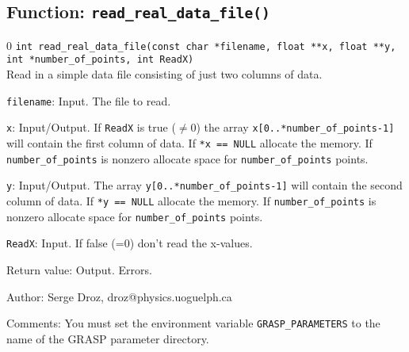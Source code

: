 \subsection{Function: {\tt read\_real\_data\_file()}}
\setcounter{equation}0
{\tt int read\_real\_data\_file(const char *filename, float **x, float **y, 
     int *number\_of\_points, int ReadX)}\\
Read in a simple data file consisting of just two columns of
data.
\begin{description}
\item{{\tt filename}}: Input. The file to read.
\item{{\tt x}}: Input/Output. If {\tt ReadX} is true ($\neq 0$) the array 
                   {\tt x[0..*number\_of\_points-1]} will contain the
				   first column of data. If {\tt **x == NULL} 
				   allocate the memory. If {\tt number\_of\_points}
				   is nonzero allocate space for {\tt number\_of\_points}
				   points. 
\item{{\tt y}}: Input/Output. The array 
                   {\tt y[0..*number\_of\_points-1]} will contain the
				   second column of data. If {\tt **y == NULL} 
				   allocate the memory. If {\tt number\_of\_points}
				   is nonzero allocate space for {\tt number\_of\_points}
				   points. 
\item{{\tt ReadX}}: Input. If false (=0) don't read the x-values.				   
\item{Return value}: Output. Errors.
\end{description}
\begin{description}
\item{Author:} Serge Droz, droz@physics.uoguelph.ca
\item{Comments:} You must set the environment variable 
                 {\tt GRASP\_PARAMETERS} to the name of the 
				 GRASP parameter directory.
\end{description}
\clearpage
%
%


